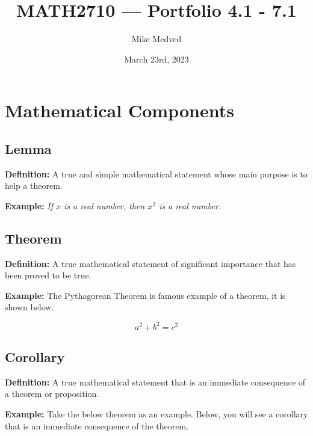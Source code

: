 \documentclass{article}
\title{MATH2710 — Portfolio 4.1 - 7.1}
\author{Mike Medved}
\date{March 23rd, 2023}
\begin{document}
\maketitle

\section*{Mathematical Components}

\subsection*{Lemma}

\textbf{Definition:} A true and simple mathematical statement whose main purpose is to help a theorem.

\textbf{Example:} \textit{If $x$ is a real number, then $x^2$ is a real number.}

\subsection*{Theorem}

\textbf{Definition:} A true mathematical statement of significant importance that has been proved to be true.

\textbf{Example:} The Pythagorean Theorem is famous example of a theorem, it is shown below.


\begin{center}
\end{center}

\begin{equation*}
a^2 + b^2 = c^2
\end{equation*}

\subsection*{Corollary}

\textbf{Definition:} A true mathematical statement that is an immediate consequence of a theorem or proposition.

\textbf{Example:} Take the below theorem as an example. Below, you will see a corollary that is an immediate consequence of the theorem.
\end{document}
